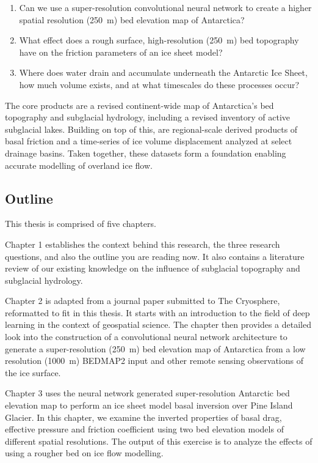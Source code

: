 \begin{enumerate}
  \item Can we use a super-resolution convolutional neural network to create a higher spatial resolution (\SI{250}{\metre}) bed elevation map of Antarctica?

  \item What effect does a rough surface, high-resolution (\SI{250}{\metre}) bed topography have on the friction parameters of an ice sheet model?

  \item Where does water drain and accumulate underneath the Antarctic Ice Sheet, how much volume exists, and at what timescales do these processes occur?
\end{enumerate}

The core products are a revised continent-wide map of Antarctica's bed topography and subglacial hydrology, including a revised inventory of active subglacial lakes.
Building on top of this, are regional-scale derived products of basal friction and a time-series of ice volume displacement analyzed at select drainage basins.
Taken together, these datasets form a foundation enabling accurate modelling of overland ice flow.

\subsection{Outline}

This thesis is comprised of five chapters.

Chapter 1 establishes the context behind this research, the three research questions, and also the outline you are reading now.
It also contains a literature review of our existing knowledge on the influence of subglacial topography and subglacial hydrology.

Chapter 2 is adapted from a journal paper submitted to The Cryosphere, reformatted to fit in this thesis.
It starts with an introduction to the field of deep learning in the context of geospatial science.
The chapter then provides a detailed look into the construction of a convolutional neural network architecture to generate a super-resolution (\SI{250}{\metre}) bed elevation map of Antarctica from a low resolution (\SI{1000}{\metre}) BEDMAP2 input and other remote sensing observations of the ice surface.

Chapter 3 uses the neural network generated super-resolution Antarctic bed elevation map to perform an ice sheet model basal inversion over Pine Island Glacier.
In this chapter, we examine the inverted properties of basal drag, effective pressure and friction coefficient using two bed elevation models of different spatial resolutions.
The output of this exercise is to analyze the effects of using a rougher bed on ice flow modelling.

